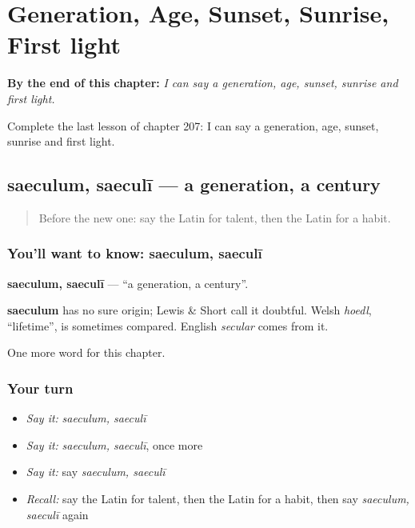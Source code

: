
\chapter{Generation, Age, Sunset, Sunrise, First light}
\label{ch:la-generation-age-sunset-sunrise-first-light}

\begin{chapteropening}
\textbf{By the end of this chapter:} \emph{I can say a generation, age, sunset, sunrise and first light.}

Complete the last lesson of chapter 207: I can say a generation, age, sunset, sunrise and first light.
\end{chapteropening}

\section[saeculum, saeculī]{saeculum, saeculī — a generation, a century}

\label{lesson:LA-C207-saeculum}



\begin{quote}
Before the new one: say the Latin for talent, then the Latin for a habit.
\end{quote}

\subsection*{You'll want to know: saeculum, saeculī}
\textbf{saeculum, saeculī} — \textquotedblleft{}a generation, a century\textquotedblright{}.

\begin{cousinweb}
\textbf{saeculum} has no sure origin; Lewis \& Short call it doubtful. Welsh \emph{hoedl}, \textquotedblleft{}lifetime\textquotedblright{}, is sometimes compared. English \emph{secular} comes from it.
\end{cousinweb}

\begin{grammarlens}[title={What you've built}]
One more word for this chapter.
\end{grammarlens}

\subsection*{Your turn}
\begin{itemize}
\raggedright
  \item \emph{Say it:} \emph{saeculum, saeculī}
  \item \emph{Say it:} \emph{saeculum, saeculī}, once more
  \item \emph{Say it:} say \emph{saeculum, saeculī}
  \item \emph{Recall:} say the Latin for talent, then the Latin for a habit, then say \emph{saeculum, saeculī} again
\end{itemize}

